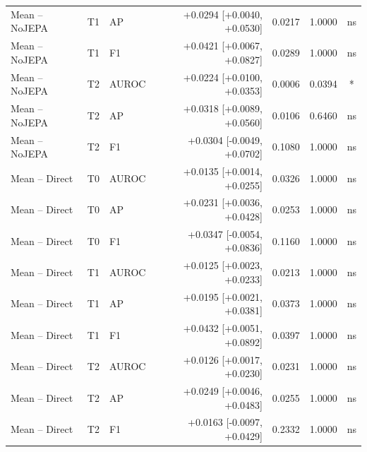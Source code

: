 \begin{table}[t]
\begin{tabular}{lllrrrc}
Mean -- NoJEPA & T1 & AP & +0.0294 [+0.0040, +0.0530] & 0.0217 & 1.0000 & ns \\
Mean -- NoJEPA & T1 & F1 & +0.0421 [+0.0067, +0.0827] & 0.0289 & 1.0000 & ns \\
Mean -- NoJEPA & T2 & AUROC & +0.0224 [+0.0100, +0.0353] & 0.0006 & 0.0394 & * \\
Mean -- NoJEPA & T2 & AP & +0.0318 [+0.0089, +0.0560] & 0.0106 & 0.6460 & ns \\
Mean -- NoJEPA & T2 & F1 & +0.0304 [-0.0049, +0.0702] & 0.1080 & 1.0000 & ns \\
Mean -- Direct & T0 & AUROC & +0.0135 [+0.0014, +0.0255] & 0.0326 & 1.0000 & ns \\
Mean -- Direct & T0 & AP & +0.0231 [+0.0036, +0.0428] & 0.0253 & 1.0000 & ns \\
Mean -- Direct & T0 & F1 & +0.0347 [-0.0054, +0.0836] & 0.1160 & 1.0000 & ns \\
Mean -- Direct & T1 & AUROC & +0.0125 [+0.0023, +0.0233] & 0.0213 & 1.0000 & ns \\
Mean -- Direct & T1 & AP & +0.0195 [+0.0021, +0.0381] & 0.0373 & 1.0000 & ns \\
Mean -- Direct & T1 & F1 & +0.0432 [+0.0051, +0.0892] & 0.0397 & 1.0000 & ns \\
Mean -- Direct & T2 & AUROC & +0.0126 [+0.0017, +0.0230] & 0.0231 & 1.0000 & ns \\
Mean -- Direct & T2 & AP & +0.0249 [+0.0046, +0.0483] & 0.0255 & 1.0000 & ns \\
Mean -- Direct & T2 & F1 & +0.0163 [-0.0097, +0.0429] & 0.2332 & 1.0000 & ns \\
\bottomrule
\end{tabular}
\end{table}
